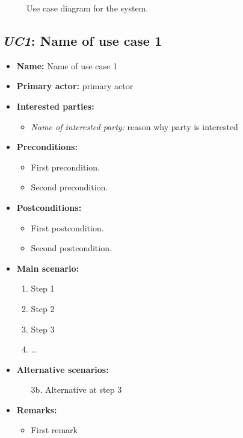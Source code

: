 \documentclass[a4paper,10pt]{article}
\begin{document}
\begin{figure}[!htp]
    \centering
    \caption{Use case diagram for the system.}\label{fig:use_case_model}
\end{figure}

\subsection{\emph{UC1}: Name of use case 1}
\begin{itemize}
    \item \textbf{Name:} Name of use case 1
    \item \textbf{Primary actor:} primary actor
    \item \textbf{Interested parties:} 
        \begin{itemize}
            \item \textit{Name of interested party:} reason why party is interested
        \end{itemize}

    \item \textbf{Preconditions:}
        \begin{itemize}
            \item First precondition.
            \item Second precondition.
        \end{itemize}

    \item \textbf{Postconditions:}
        \begin{itemize}
            \item First postcondition.
            \item Second postcondition.
        \end{itemize}
        
    \item \textbf{Main scenario:} 
    \begin{enumerate}
       \item Step 1
       \item Step 2
       \item Step 3
       \item \ldots
    \end{enumerate}

    \item \textbf{Alternative scenarios:} 
    \begin{enumerate}
        \item [3b.] Alternative at step 3
    \end{enumerate}
    
    \item \textbf{Remarks:}
        \begin{itemize}
            \item First remark
        \end{itemize}
\end{itemize}
\end{document}
